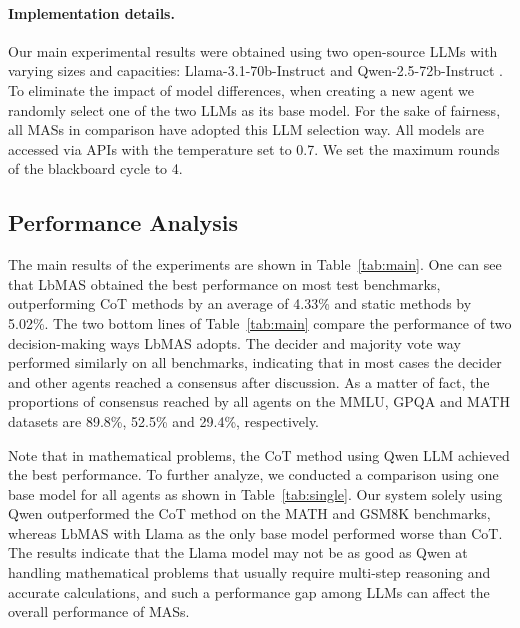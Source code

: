 \documentclass[11pt]{article}
\begin{document}
\paragraph{Implementation details.}
Our main experimental results were obtained using two open-source LLMs with varying sizes and capacities: Llama-3.1-70b-Instruct \citep{DBLP:journals/corr/abs-2407-21783} and Qwen-2.5-72b-Instruct \citep{qwen2025qwen25technicalreport}. To eliminate the impact of model differences, when creating a new agent we randomly select one of the two LLMs as its base model. For the sake of fairness, all MASs in comparison have adopted this LLM selection way. All models are accessed via APIs with the temperature set to 0.7. We set the maximum rounds of the blackboard cycle to 4. 



\subsection{Performance Analysis}

The main results of the experiments are shown in Table~\ref{tab:main}. 
One can see that LbMAS obtained the best performance on most test benchmarks, outperforming CoT methods by an average of 4.33\% and static methods by 5.02\%. The two bottom lines of Table~\ref{tab:main} compare the performance of two decision-making ways LbMAS adopts. The decider and majority vote way performed similarly on all benchmarks, indicating that in most cases the decider and other agents reached a consensus after discussion. As a matter of fact, the proportions of consensus reached by all agents on the MMLU, GPQA and MATH datasets are 89.8\%, 52.5\% and 29.4\%, respectively. 

Note that in mathematical problems, the CoT method using Qwen LLM achieved the best performance. To further analyze, we conducted a comparison using one base model for all agents as shown in Table~\ref{tab:single}. Our system solely using Qwen outperformed the CoT method on the MATH and GSM8K benchmarks, whereas LbMAS with Llama as the only base model performed worse than CoT. The results indicate that the Llama model may not be as good as Qwen at handling mathematical problems that usually require multi-step reasoning and accurate calculations, and such a performance gap among LLMs can affect the overall performance of MASs.
\end{document}
